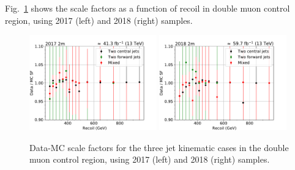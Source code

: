 Fig.~\ref{fig:sf_recoil_2m} shows the scale factors as a function of recoil in double muon control region, using 2017 (left)
and 2018 (right) samples. 

\begin{figure}[hbp]
    \begin{center}
        \includegraphics[width=0.49\textwidth]{fig/efficiency/trigger/met/recoil/scale_factors_2m_2017.pdf}
        \includegraphics[width=0.49\textwidth]{fig/efficiency/trigger/met/recoil/scale_factors_2m_2018.pdf} 
    \end{center}
    \caption{Data-MC scale factors for the three jet kinematic cases in the double muon control region, using 2017 (left) and 2018 (right) samples.}
    \label{fig:sf_recoil_2m}
\end{figure}

